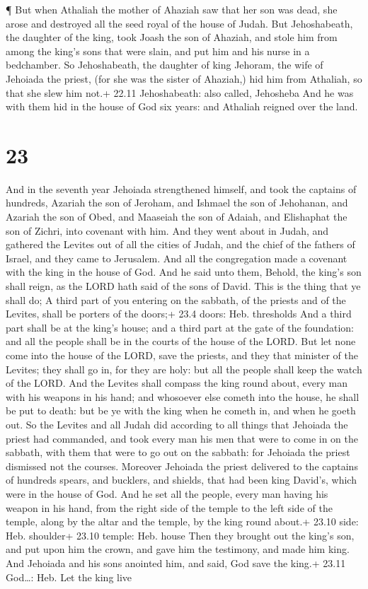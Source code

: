  ¶ But when Athaliah the mother of Ahaziah saw that her son
was dead, she arose and destroyed all the seed royal of the house of
Judah.  But Jehoshabeath, the daughter of the king, took
Joash the son of Ahaziah, and stole him from among the king's sons that
were slain, and put him and his nurse in a bedchamber. So Jehoshabeath,
the daughter of king Jehoram, the wife of Jehoiada the priest, (for she
was the sister of Ahaziah,) hid him from Athaliah, so that she slew him
not.+ 22.11 Jehoshabeath: also called, Jehosheba  And he
was with them hid in the house of God six years: and Athaliah reigned
over the land.

\hypertarget{section-22}{%
\section{23}\label{section-22}}

 And in the seventh year Jehoiada strengthened himself, and
took the captains of hundreds, Azariah the son of Jeroham, and Ishmael
the son of Jehohanan, and Azariah the son of Obed, and Maaseiah the son
of Adaiah, and Elishaphat the son of Zichri, into covenant with him.
 And they went about in Judah, and gathered the Levites out
of all the cities of Judah, and the chief of the fathers of Israel, and
they came to Jerusalem.  And all the congregation made a
covenant with the king in the house of God. And he said unto them,
Behold, the king's son shall reign, as the LORD hath said of the sons of
David.  This is the thing that ye shall do; A third part of
you entering on the sabbath, of the priests and of the Levites, shall be
porters of the doors;+ 23.4 doors: Heb. thresholds  And a
third part shall be at the king's house; and a third part at the gate of
the foundation: and all the people shall be in the courts of the house
of the LORD.  But let none come into the house of the LORD,
save the priests, and they that minister of the Levites; they shall go
in, for they are holy: but all the people shall keep the watch of the
LORD.  And the Levites shall compass the king round about,
every man with his weapons in his hand; and whosoever else cometh into
the house, he shall be put to death: but be ye with the king when he
cometh in, and when he goeth out.  So the Levites and all
Judah did according to all things that Jehoiada the priest had
commanded, and took every man his men that were to come in on the
sabbath, with them that were to go out on the sabbath: for Jehoiada the
priest dismissed not the courses.  Moreover Jehoiada the
priest delivered to the captains of hundreds spears, and bucklers, and
shields, that had been king David's, which were in the house of God.
 And he set all the people, every man having his weapon in
his hand, from the right side of the temple to the left side of the
temple, along by the altar and the temple, by the king round about.+
23.10 side: Heb. shoulder+ 23.10 temple: Heb. house  Then
they brought out the king's son, and put upon him the crown, and gave
him the testimony, and made him king. And Jehoiada and his sons anointed
him, and said, God save the king.+ 23.11 God\ldots: Heb. Let the king
live

